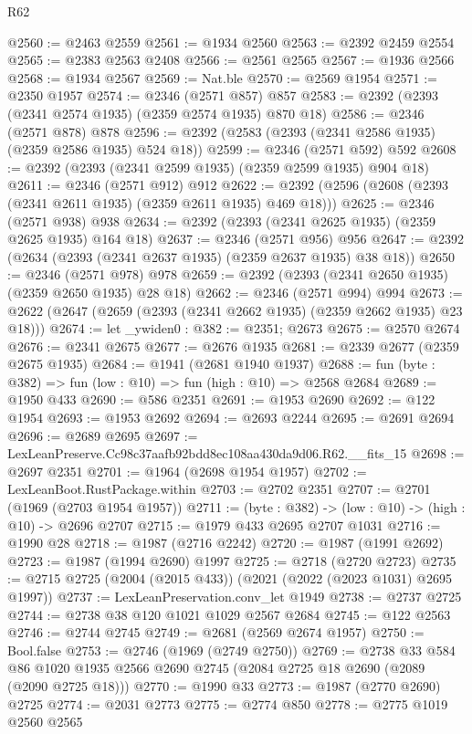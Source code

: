 \begin{lexlean}{R62}
\begin{coremodule}
@2560 := @2463 @2559
@2561 := @1934 @2560
@2563 := @2392 @2459 @2554
@2565 := @2383 @2563 @2408
@2566 := @2561 @2565
@2567 := @1936 @2566
@2568 := @1934 @2567
@2569 := Nat.ble
@2570 := @2569 @1954
@2571 := @2350 @1957
@2574 := @2346 (@2571 @857) @857
@2583 := @2392 (@2393 (@2341 @2574 @1935) (@2359 @2574 @1935) @870 @18)
@2586 := @2346 (@2571 @878) @878
@2596 := @2392 (@2583 (@2393 (@2341 @2586 @1935) (@2359 @2586 @1935) @524 @18))
@2599 := @2346 (@2571 @592) @592
@2608 := @2392 (@2393 (@2341 @2599 @1935) (@2359 @2599 @1935) @904 @18)
@2611 := @2346 (@2571 @912) @912
@2622 := @2392 (@2596 (@2608 (@2393 (@2341 @2611 @1935) (@2359 @2611 @1935) @469 @18)))
@2625 := @2346 (@2571 @938) @938
@2634 := @2392 (@2393 (@2341 @2625 @1935) (@2359 @2625 @1935) @164 @18)
@2637 := @2346 (@2571 @956) @956
@2647 := @2392 (@2634 (@2393 (@2341 @2637 @1935) (@2359 @2637 @1935) @38 @18))
@2650 := @2346 (@2571 @978) @978
@2659 := @2392 (@2393 (@2341 @2650 @1935) (@2359 @2650 @1935) @28 @18)
@2662 := @2346 (@2571 @994) @994
@2673 := @2622 (@2647 (@2659 (@2393 (@2341 @2662 @1935) (@2359 @2662 @1935) @23 @18)))
@2674 := let _ywiden0 : @382 := @2351; @2673
@2675 := @2570 @2674
@2676 := @2341 @2675
@2677 := @2676 @1935
@2681 := @2339 @2677 (@2359 @2675 @1935)
@2684 := @1941 (@2681 @1940 @1937)
@2688 := fun (byte : @382) => fun (low : @10) => fun (high : @10) => @2568 @2684
@2689 := @1950 @433
@2690 := @586 @2351
@2691 := @1953 @2690
@2692 := @122 @1954
@2693 := @1953 @2692
@2694 := @2693 @2244
@2695 := @2691 @2694
@2696 := @2689 @2695
@2697 := LexLeanPreserve.Cc98c37aafb92bdd8ec108aa430da9d06.R62.__fits_15
@2698 := @2697 @2351
@2701 := @1964 (@2698 @1954 @1957)
@2702 := LexLeanBoot.RustPackage.within
@2703 := @2702 @2351
@2707 := @2701 (@1969 (@2703 @1954 @1957))
@2711 := (byte : @382) -> (low : @10) -> (high : @10) -> @2696 @2707
@2715 := @1979 @433 @2695 @2707 @1031
@2716 := @1990 @28
@2718 := @1987 (@2716 @2242)
@2720 := @1987 (@1991 @2692)
@2723 := @1987 (@1994 @2690) @1997
@2725 := @2718 (@2720 @2723)
@2735 := @2715 @2725 (@2004 (@2015 @433)) (@2021 (@2022 (@2023 @1031) @2695 @1997))
@2737 := LexLeanPreservation.conv_let @1949
@2738 := @2737 @2725
@2744 := @2738 @38 @120 @1021 @1029 @2567 @2684
@2745 := @122 @2563
@2746 := @2744 @2745
@2749 := @2681 (@2569 @2674 @1957)
@2750 := Bool.false
@2753 := @2746 (@1969 (@2749 @2750))
@2769 := @2738
    @33
    @584
    @86
    @1020
    @1935
    @2566
    @2690
    @2745
    (@2084 @2725 @18 @2690 (@2089 (@2090 @2725 @18)))
@2770 := @1990 @33
@2773 := @1987 (@2770 @2690) @2725
@2774 := @2031 @2773
@2775 := @2774 @850
@2778 := @2775 @1019 @2560 @2565

\end{coremodule}
\end{lexlean}

